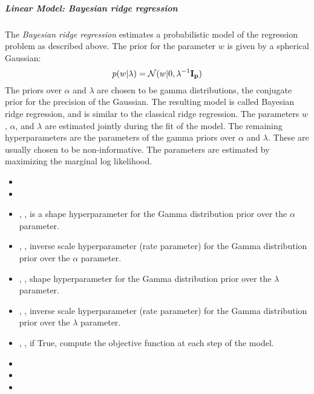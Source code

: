 \subparagraph{Linear Model: Bayesian ridge regression}
\mbox{}

The \textit{Bayesian ridge regression} estimates a probabilistic model of the
regression problem as described above.
%
The prior for the parameter $w$ is given by a spherical Gaussian:
\begin{equation}
p(w|\lambda) =\mathcal{N}(w|0,\lambda^{-1}\bold{I_{p}})
\end{equation}
The priors over $\alpha$ and $\lambda$ are chosen to be gamma distributions, the
conjugate prior for the precision of the Gaussian.
%
The resulting model is called Bayesian ridge regression, and is similar to the
classical ridge regression.
%
The parameters $w$, $\alpha$, and $\lambda$ are estimated jointly during the fit
of the model.
%
The remaining hyperparameters are the parameters of the gamma priors over
$\alpha$ and $\lambda$.
%
These are usually chosen to be non-informative.
%
The parameters are estimated by maximizing the marginal log likelihood.
%
\begin{itemize}
  \item {}
  \item {}
  \item {}, , is a shape
  hyperparameter for the Gamma distribution prior over the $\alpha$ parameter.
  \item {}, , inverse scale
  hyperparameter (rate parameter) for the Gamma distribution prior over the
  $\alpha$ parameter.
  \item {}, , shape
  hyperparameter for the Gamma distribution prior over the $\lambda$ parameter.
  \item {}, , inverse scale
  hyperparameter (rate parameter) for the Gamma distribution prior over the
  $\lambda$ parameter.
  \item {}, , if True,
  compute the objective function at each step of the model.
  \item {}
  \item {}
  \item {}
\end{itemize}

